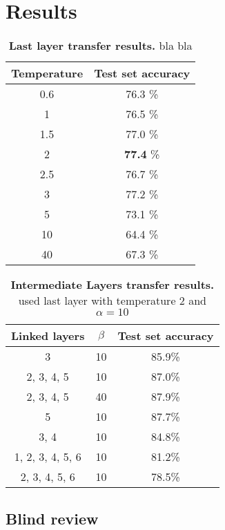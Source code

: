 \documentclass[10pt,twocolumn,letterpaper]{article}
\begin{document}
\section{Results}
\begin{table}[]
	\begin{center}
	\begin{tabular}{|c|c|}
		\hline
		Temperature	&	Test set accuracy\\ \hline
		0.6	&	76.3 \%	\\ \hline
		1	&	76.5 \%	\\ \hline
		1.5	&	77.0 \%	\\ \hline
		2	&	\textbf{77.4} \%	\\ \hline
		2.5	&	76.7 \%	\\ \hline
		3	&	77.2 \%	\\ \hline
		5	&	73.1 \%	\\ \hline
		10	&	64.4 \%	\\ \hline
		40	&	67.3 \%	\\ \hline
	\end{tabular}
	\end{center}
	\caption{\textbf{Last layer transfer results.} bla bla}
	\label{tab:LL_results}
\end{table}

\begin{table}[]
	\begin{center}
	\begin{tabular}{|c|c|c|}
		\hline
		Linked layers	&	$\beta$	&	Test set accuracy\\ \hline
		3	&	10	&	85.9\%	\\ \hline
		2, 3, 4, 5	&	10	&	87.0\%	\\ \hline
		2, 3, 4, 5	&	40	&	87.9\%	\\ \hline
		5	&	10	&	87.7\%	\\ \hline
		3, 4	&	10	&	84.8\%	\\ \hline
		1, 2, 3, 4, 5, 6	&	10	&	81.2\%	\\ \hline
		2, 3, 4, 5, 6	&	10	&	78.5\%	\\ \hline
	\end{tabular}
	\end{center}
	\caption{\textbf{Intermediate Layers transfer results.} used last layer with temperature 2 and $ \alpha = 10 $}
	\label{tab:interemediate_results}
\end{table}


\subsection{Blind review}
\end{document}
